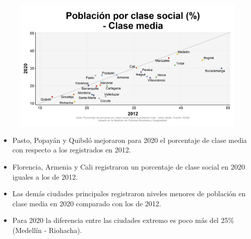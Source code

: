     \begin{figure}[H]
        \caption[Población por clase social - Clase media (2012 VS 2020) por ciudades ]{\label{clase_media_ciudades_vs} }
        \begin{center}
        \includegraphics[width=\textwidth,keepaspectratio]{img/var_247_scatter_time.png}
        \end{center}
    \end{figure}
            \begin{itemize}
                    \item Pasto, Popayán y Quibdó mejoraron para 2020 el porcentaje de clase media con respecto a los registrados en 2012.
                    \item Florencia, Armenia y Cali registraron un porcentaje de clase social en 2020 iguales a los de 2012.
                    \item Las demás ciudades principales registraron niveles menores de población en clase media en 2020 comparado con los de 2012.
                    \item Para 2020 la diferencia entre las ciudades extremo es poco más del 25\% (Medellín - Riohacha).
                    \end{itemize}

